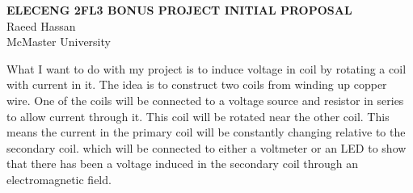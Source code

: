 \documentclass[12pt]{article}
\begin{document}
    \begin{center}
        \textbf{\Large{ELECENG 2FL3 BONUS PROJECT INITIAL PROPOSAL}} \\
        \vspace{2mm}
        \large{Raeed Hassan} \\
        McMaster University
    \end{center}
\hrulefill

What I want to do with my project is to induce voltage in coil by rotating a coil with current in it. The idea is to construct two coils from winding up copper wire. One of the coils will be connected to a voltage source and resistor in series to allow current through it. This coil will be rotated near the other coil. This means the current in the primary coil will be constantly changing relative to the secondary coil. which will be connected to either a voltmeter or an LED to show that there has been a voltage induced in the secondary coil through an electromagnetic field.
\end{document}
